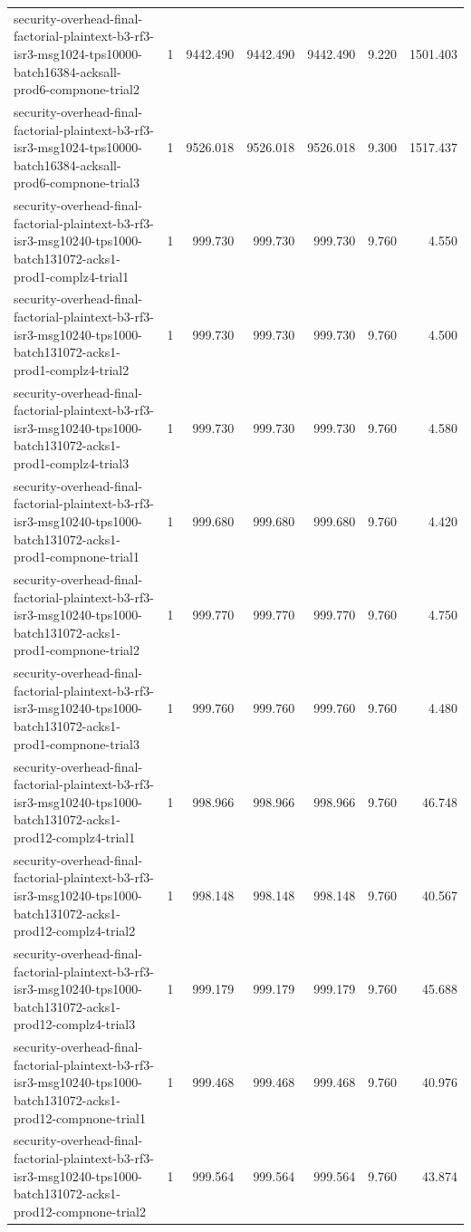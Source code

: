 \begin{tabular}{lrrrrrr}
security-overhead-final-factorial-plaintext-b3-rf3-isr3-msg1024-tps10000-batch16384-acksall-prod6-compnone-trial2 & 1 & 9442.490 & 9442.490 & 9442.490 & 9.220 & 1501.403 \\
security-overhead-final-factorial-plaintext-b3-rf3-isr3-msg1024-tps10000-batch16384-acksall-prod6-compnone-trial3 & 1 & 9526.018 & 9526.018 & 9526.018 & 9.300 & 1517.437 \\
security-overhead-final-factorial-plaintext-b3-rf3-isr3-msg10240-tps1000-batch131072-acks1-prod1-complz4-trial1 & 1 & 999.730 & 999.730 & 999.730 & 9.760 & 4.550 \\
security-overhead-final-factorial-plaintext-b3-rf3-isr3-msg10240-tps1000-batch131072-acks1-prod1-complz4-trial2 & 1 & 999.730 & 999.730 & 999.730 & 9.760 & 4.500 \\
security-overhead-final-factorial-plaintext-b3-rf3-isr3-msg10240-tps1000-batch131072-acks1-prod1-complz4-trial3 & 1 & 999.730 & 999.730 & 999.730 & 9.760 & 4.580 \\
security-overhead-final-factorial-plaintext-b3-rf3-isr3-msg10240-tps1000-batch131072-acks1-prod1-compnone-trial1 & 1 & 999.680 & 999.680 & 999.680 & 9.760 & 4.420 \\
security-overhead-final-factorial-plaintext-b3-rf3-isr3-msg10240-tps1000-batch131072-acks1-prod1-compnone-trial2 & 1 & 999.770 & 999.770 & 999.770 & 9.760 & 4.750 \\
security-overhead-final-factorial-plaintext-b3-rf3-isr3-msg10240-tps1000-batch131072-acks1-prod1-compnone-trial3 & 1 & 999.760 & 999.760 & 999.760 & 9.760 & 4.480 \\
security-overhead-final-factorial-plaintext-b3-rf3-isr3-msg10240-tps1000-batch131072-acks1-prod12-complz4-trial1 & 1 & 998.966 & 998.966 & 998.966 & 9.760 & 46.748 \\
security-overhead-final-factorial-plaintext-b3-rf3-isr3-msg10240-tps1000-batch131072-acks1-prod12-complz4-trial2 & 1 & 998.148 & 998.148 & 998.148 & 9.760 & 40.567 \\
security-overhead-final-factorial-plaintext-b3-rf3-isr3-msg10240-tps1000-batch131072-acks1-prod12-complz4-trial3 & 1 & 999.179 & 999.179 & 999.179 & 9.760 & 45.688 \\
security-overhead-final-factorial-plaintext-b3-rf3-isr3-msg10240-tps1000-batch131072-acks1-prod12-compnone-trial1 & 1 & 999.468 & 999.468 & 999.468 & 9.760 & 40.976 \\
security-overhead-final-factorial-plaintext-b3-rf3-isr3-msg10240-tps1000-batch131072-acks1-prod12-compnone-trial2 & 1 & 999.564 & 999.564 & 999.564 & 9.760 & 43.874 \\

\end{tabular}
